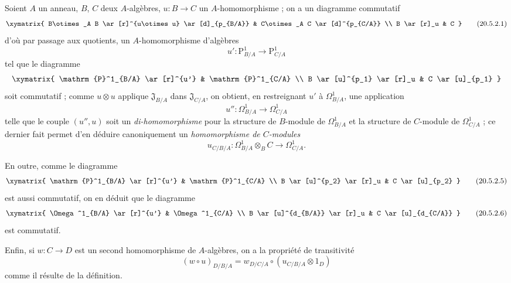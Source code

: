 \begin{env}[20.5.2]
\label{0.20.5.2-fr}
Soient $A$ un anneau, $B$, $C$ deux $A$-algèbres, $u:B\to C$ un
$A$-homomorphisme ; on a un diagramme commutatif
\[
\xymatrix{
  B\otimes_A B \ar[r]^{u\otimes u} \ar[d]_{p_{B/A}} &
  C\otimes_A C \ar[d]^{p_{C/A}} \\
  B \ar[r]_u & C
}
\tag{20.5.2.1}
\label{0.20.5.2.1-fr}
\]
d'où par passage aux quotients, un $A$-homomorphisme d'algèbres
\begin{equation}
\tag{20.5.2.2}
\label{0.20.5.2.2-fr}
  u':\mathrm{P}^1_{B/A}\to\mathrm{P}^1_{C/A}
\end{equation}
tel que le diagramme
\[
\xymatrix{
  \mathrm{P}^1_{B/A} \ar[r]^{u'} & \mathrm{P}^1_{C/A} \\
  B \ar[u]^{p_1} \ar[r]_u & C \ar[u]_{p_1}
}
\]
soit commutatif ; comme $u\otimes u$ applique $\mathfrak{J}_{B/A}$ dans
$\mathfrak{J}_{C/A}$, on obtient, en restreignant $u'$ à
$\Omega^1_{B/A}$, une application
\begin{equation}
\tag{20.5.2.3}
\label{0.20.5.2.3-fr}
  u'':\Omega^1_{B/A}\to\Omega^1_{C/A}
\end{equation}
telle que le couple $(u'',u)$ soit un \emph{di-homomorphisme} pour la
structure de $B$-module de $\Omega^1_{B/A}$ et la structure de $C$-module de
$\Omega^1_{C/A}$ ; ce dernier fait permet d'en déduire canoniquement un
\emph{homomorphisme de $C$-modules}
\begin{equation}
\tag{20.5.2.4}
\label{0.20.5.2.4-fr}
  u_{C/B/A}:\Omega^1_{B/A}\otimes_B C\to\Omega^1_{C/A}.
\end{equation}

En outre, comme le diagramme
\[
\xymatrix{
  \mathrm{P}^1_{B/A} \ar[r]^{u'} & \mathrm{P}^1_{C/A} \\
  B \ar[u]^{p_2} \ar[r]_u & C \ar[u]_{p_2}
}
\tag{20.5.2.5}
\label{0.20.5.2.5-fr}
\]
est aussi commutatif, on en déduit que le diagramme
\[
\xymatrix{
  \Omega^1_{B/A} \ar[r]^{u'} & \Omega^1_{C/A} \\
  B \ar[u]^{d_{B/A}} \ar[r]_u & C \ar[u]_{d_{C/A}}
}
\tag{20.5.2.6}
\label{0.20.5.2.6-fr}
\]
est commutatif.

Enfin, si $w:C\to D$ est un second homomorphisme de $A$-algèbres, on a la
propriété de transitivité
\begin{equation}
\tag{20.5.2.7}
\label{0.20.5.2.7-fr}
  (w\circ u)_{D/B/A}
  =w_{D/C/A}\circ(u_{C/B/A}\otimes1_D)
\end{equation}
comme il résulte de la définition.
\end{env}

